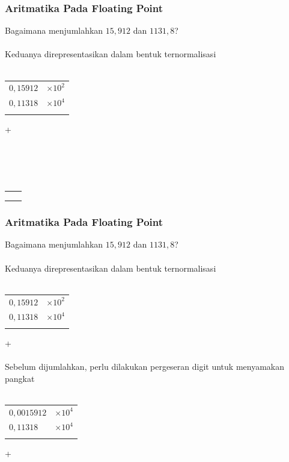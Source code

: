 \documentclass{beamer}
\begin{document}
\begin{frame}
\frametitle{Aritmatika Pada Floating Point}
Bagaimana menjumlahkan  $15,912$ dan $1131,8$?
\\\ \\Keduanya direpresentasikan dalam bentuk ternormalisasi
\\\ \\\begin{tabular}{rl}
	$0,15912$ & $\times 10^2$\\
	$0,11318$ & $\times 10^4$\\
	\hline
	& \\
\end{tabular}+
\\\ \\\ \\\
\\\ \\\begin{tabular}{rl}
	& \\
	& \\
	& \\
\end{tabular}
\end{frame}


\begin{frame}
\frametitle{Aritmatika Pada Floating Point}
Bagaimana menjumlahkan  $15,912$ dan $1131,8$?
\\\ \\Keduanya direpresentasikan dalam bentuk ternormalisasi
\\\ \\\begin{tabular}{rl}
	$0,15912$ & $\times 10^2$\\
	$0,11318$ & $\times 10^4$\\
	\hline
	& \\
\end{tabular}+
\\\ \\Sebelum dijumlahkan, perlu dilakukan pergeseran digit untuk menyamakan pangkat
\\\ \\\begin{tabular}{ll}
	$0,0015912$ & $\times 10^4$\\
	$0,11318$ & $\times 10^4$\\
	\hline
	& \\
\end{tabular}+
\end{frame}
\end{document}
